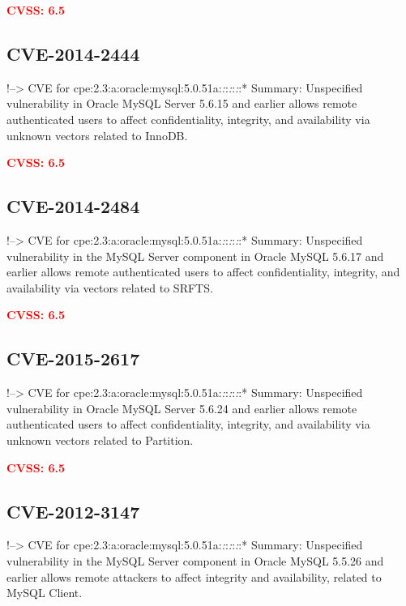 \documentclass[a4paper, 12pt]{article}
\begin{document}
\textbf{\textcolor{red}{CVSS: 6.5}}

\hypertarget{cve-2014-2444}{%
\subsection{CVE-2014-2444}\label{cve-2014-2444}}

!--\textgreater{} CVE for
cpe:2.3:a:oracle:mysql:5.0.51a:\emph{:}:\emph{:}:\emph{:}:* Summary:
Unspecified vulnerability in Oracle MySQL Server 5.6.15 and earlier
allows remote authenticated users to affect confidentiality, integrity,
and availability via unknown vectors related to InnoDB.

\textbf{\textcolor{red}{CVSS: 6.5}}

\hypertarget{cve-2014-2484}{%
\subsection{CVE-2014-2484}\label{cve-2014-2484}}

!--\textgreater{} CVE for
cpe:2.3:a:oracle:mysql:5.0.51a:\emph{:}:\emph{:}:\emph{:}:* Summary:
Unspecified vulnerability in the MySQL Server component in Oracle MySQL
5.6.17 and earlier allows remote authenticated users to affect
confidentiality, integrity, and availability via vectors related to
SRFTS.

\textbf{\textcolor{red}{CVSS: 6.5}}

\hypertarget{cve-2015-2617}{%
\subsection{CVE-2015-2617}\label{cve-2015-2617}}

!--\textgreater{} CVE for
cpe:2.3:a:oracle:mysql:5.0.51a:\emph{:}:\emph{:}:\emph{:}:* Summary:
Unspecified vulnerability in Oracle MySQL Server 5.6.24 and earlier
allows remote authenticated users to affect confidentiality, integrity,
and availability via unknown vectors related to Partition.

\textbf{\textcolor{red}{CVSS: 6.5}}

\hypertarget{cve-2012-3147}{%
\subsection{CVE-2012-3147}\label{cve-2012-3147}}

!--\textgreater{} CVE for
cpe:2.3:a:oracle:mysql:5.0.51a:\emph{:}:\emph{:}:\emph{:}:* Summary:
Unspecified vulnerability in the MySQL Server component in Oracle MySQL
5.5.26 and earlier allows remote attackers to affect integrity and
availability, related to MySQL Client.
\end{document}
